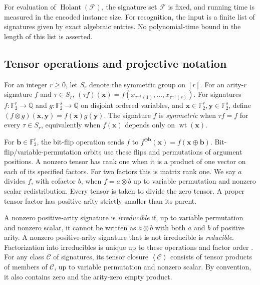 \documentclass[11pt,letterpaper,onecolumn]{article}
\theoremstyle{plain}
\theoremstyle{definition}
\theoremstyle{remark}
\newcommand{\AlgNums}{\overline{\mathbb Q}}
\newcommand{\Ftwo}{\mathbb F_2}
\newcommand{\cF}{\mathcal F}
\newcommand{\cC}{\mathscr C}
\newcommand{\angles}[1]{\left\langle #1\right\rangle}
\newcommand{\Holant}{\operatorname{Holant}}
\newcommand{\wt}{\operatorname{wt}}
\begin{document}
For evaluation of \(\Holant(\cF)\), the signature set \(\cF\) is fixed,
and running time is measured in the encoded instance size.  For recognition,
the input is a finite list of signatures given by exact algebraic entries.
No polynomial-time bound
in the length of this list is asserted.  

\subsection{Tensor operations and projective notation}
\label{subsec:algebra-group-terminology}

For an integer \(r\ge0\), let \(S_r\) denote the symmetric group on
	\([r]\).  For an arity-\(r\) signature \(f\) and \(\tau\in S_r\),
	\((\tau f)({\mathbf x})=f(x_{\tau^{-1}(1)},\ldots,x_{\tau^{-1}(r)})\).  For signatures
	\(f:\Ftwo^r\to\AlgNums\) and \(g:\Ftwo^s\to\AlgNums\) on disjoint ordered
	variables, and \({\mathbf x}\in\Ftwo^r,{\mathbf y}\in\Ftwo^s\), define
	\((f\otimes g)({\mathbf x},{\mathbf y})=f({\mathbf x})g({\mathbf y})\).
	The signature \(f\) is \emph{symmetric} when \(\tau f=f\) for every
	\(\tau\in S_r\), equivalently when \(f({\mathbf x})\) depends only on \(\wt({\mathbf x})\).

For \({\mathbf b}\in\Ftwo^r\), the bit-flip operation sends \(f\) to
\(f^{\oplus {\mathbf b}}({\mathbf x})=f({\mathbf x}\oplus {\mathbf b})\).  Bit-flip/variable-permutation orbits use
these flips and permutations of argument positions.
A nonzero tensor has rank one when it is a product of one vector on each
of its specified factors. For two factors this is matrix rank one.
We say \(a\) divides \(f\), with cofactor \(b\), when
\(f=a\otimes b\) up to variable permutation and nonzero scalar redistribution.
Every tensor is taken to divide the zero tensor.  A proper tensor factor
has positive arity strictly smaller than its parent.

A nonzero positive-arity signature is \emph{irreducible} if, up to variable permutation and nonzero scalar, it cannot
	be written as \(a\otimes b\) with both \(a\) and \(b\) of positive arity.
	A nonzero positive-arity signature that is not irreducible is
	\emph{reducible}.
	Factorization into irreducibles is unique up to these operations and factor order
	\cite[full version, Lemma~2.13]{CaiFuShao2020ARS}.  For any class \(\cC\) of
	signatures, its tensor closure \(\angles{\cC}\) consists of tensor products
	of members of \(\cC\), up to variable permutation and nonzero scalar.  By
	convention, it also contains zero and the arity-zero empty product.
\end{document}
